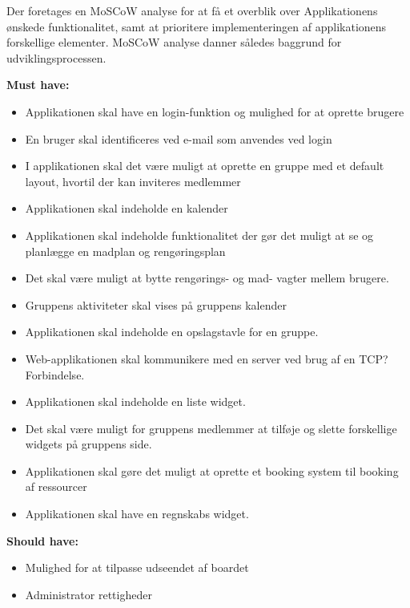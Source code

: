 Der foretages en MoSCoW analyse for at få et overblik over Applikationens ønskede funktionalitet, samt at prioritere implementeringen af applikationens forskellige elementer. MoSCoW analyse danner således baggrund for udviklingsprocessen.
\newline\newline

\noindent \textbf{Must have:}

\begin{itemize}
    \item Applikationen skal have en login-funktion og mulighed for at oprette brugere
    \item En bruger skal identificeres ved e-mail som anvendes ved login
    \item I applikationen skal det være muligt at oprette en gruppe med et default layout, hvortil der kan inviteres medlemmer
    \item Applikationen skal indeholde en kalender
    \item Applikationen skal indeholde funktionalitet der gør det muligt at se og planlægge en madplan og rengøringsplan
    \item Det skal være muligt at bytte rengørings- og mad- vagter mellem brugere. 
    \item Gruppens aktiviteter skal vises på gruppens kalender
    \item Applikationen skal indeholde en opslagstavle for en gruppe.
    \item Web-applikationen skal kommunikere med en server ved brug af en TCP? Forbindelse.
    \item Applikationen skal indeholde en liste widget.
    \item Det skal være muligt for gruppens medlemmer at tilføje og slette forskellige widgets på gruppens side.
    \item Applikationen skal gøre det muligt at oprette et booking system til booking af ressourcer
    \item Applikationen skal have en regnskabs widget.
\end{itemize}

\noindent \textbf{Should have:}

\begin{itemize}
    \item Mulighed for at tilpasse udseendet af boardet
    \item Administrator rettigheder
\end{itemize}

